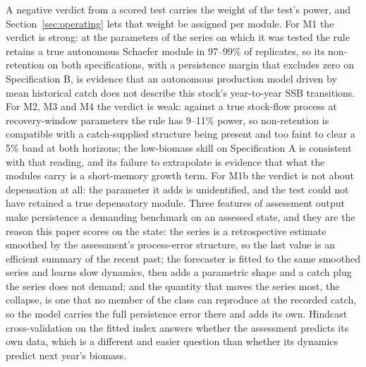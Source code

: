 A negative verdict from a scored test carries the weight of the test's power, and Section~\ref{sec:operating} lets that weight be assigned per module. For M1 the verdict is strong: at the parameters of the series on which it was tested the rule retains a true autonomous Schaefer module in 97--99\% of replicates, so its non-retention on both specifications, with a persistence margin that excludes zero on Specification B, is evidence that an autonomous production model driven by mean historical catch does not describe this stock's year-to-year SSB transitions. For M2, M3 and M4 the verdict is weak: against a true stock-flow process at recovery-window parameters the rule has 9--11\% power, so non-retention is compatible with a catch-supplied structure being present and too faint to clear a 5\% band at both horizons; the low-biomass skill on Specification A is consistent with that reading, and its failure to extrapolate is evidence that what the modules carry is a short-memory growth term. For M1b the verdict is not about depensation at all: the parameter it adds is unidentified, and the test could not have retained a true depensatory module. Three features of assessment output make persistence a demanding benchmark on an assessed state, and they are the reason this paper scores on the state: the series is a retrospective estimate smoothed by the assessment's process-error structure, so the last value is an efficient summary of the recent past; the forecaster is fitted to the same smoothed series and learns slow dynamics, then adds a parametric shape and a catch plug the series does not demand; and the quantity that moves the series most, the collapse, is one that no member of the class can reproduce at the recorded catch, so the model carries the full persistence error there and adds its own. Hindcast cross-validation on the fitted index \citep{Kell2016,Kell2021,Carvalho2021} answers whether the assessment predicts its own data, which is a different and easier question than whether its dynamics predict next year's biomass.
